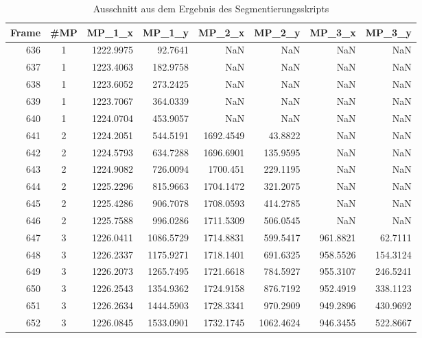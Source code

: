 \begin{table}[p]
    \caption{Ausschnitt aus dem Ergebnis des Segmentierungsskripts}
	\small
	\centering
    \begin{tabular}{@{}rcrrrrrr@{}}
    \toprule
    Frame   & \#MP & MP\_1\_x  & MP\_1\_y  & MP\_2\_x  & MP\_2\_y  & MP\_3\_x & MP\_3\_y \\ \midrule
    636     & 1    & 1222.9975 & 92.7641   & NaN       & NaN       & NaN      & NaN      \\
    637     & 1    & 1223.4063 & 182.9758  & NaN       & NaN       & NaN      & NaN      \\
    638     & 1    & 1223.6052 & 273.2425  & NaN       & NaN       & NaN      & NaN      \\
    639     & 1    & 1223.7067 & 364.0339  & NaN       & NaN       & NaN      & NaN      \\
    640     & 1    & 1224.0704 & 453.9057  & NaN       & NaN       & NaN      & NaN      \\
    641     & 2    & 1224.2051 & 544.5191  & 1692.4549 & 43.8822   & NaN      & NaN      \\
    642     & 2    & 1224.5793 & 634.7288  & 1696.6901 & 135.9595  & NaN      & NaN      \\
    643     & 2    & 1224.9082 & 726.0094  & 1700.451  & 229.1195  & NaN      & NaN      \\
    644     & 2    & 1225.2296 & 815.9663  & 1704.1472 & 321.2075  & NaN      & NaN      \\
    645     & 2    & 1225.4286 & 906.7078  & 1708.0593 & 414.2785  & NaN      & NaN      \\
    646     & 2    & 1225.7588 & 996.0286  & 1711.5309 & 506.0545  & NaN      & NaN      \\
    647     & 3    & 1226.0411 & 1086.5729 & 1714.8831 & 599.5417  & 961.8821 & 62.7111  \\
    648     & 3    & 1226.2337 & 1175.9271 & 1718.1401 & 691.6325  & 958.5526 & 154.3124 \\
    649     & 3    & 1226.2073 & 1265.7495 & 1721.6618 & 784.5927  & 955.3107 & 246.5241 \\
    650     & 3    & 1226.2543 & 1354.9362 & 1724.9158 & 876.7192  & 952.4919 & 338.1123 \\
    651     & 3    & 1226.2634 & 1444.5903 & 1728.3341 & 970.2909  & 949.2896 & 430.9692 \\
    652     & 3    & 1226.0845 & 1533.0901 & 1732.1745 & 1062.4624 & 946.3455 & 522.8667 \\

\end{tabular}
\end{table}
